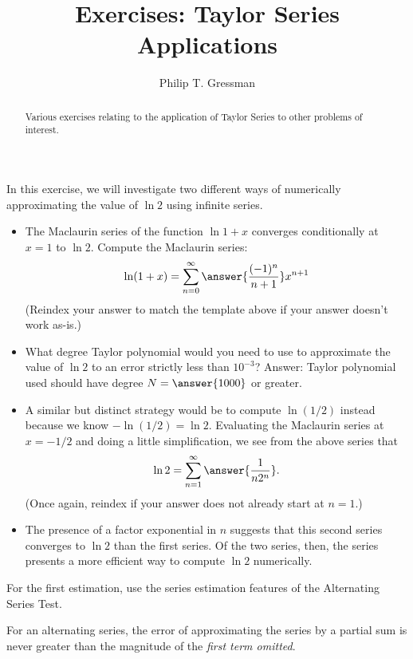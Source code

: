 \documentclass{ximera}
\title{Exercises: Taylor Series Applications}
\author{Philip T. Gressman}
\begin{document}
\begin{abstract}
Various exercises relating to the application of Taylor Series to other problems of interest.
\end{abstract}
\maketitle



\begin{exercise}
In this exercise, we will investigate two different ways of numerically approximating the value of $\ln 2$ using infinite series.

\begin{itemize}
\item The Maclaurin series of the function $\ln 1 + x$ converges conditionally at $x = 1$ to $\ln 2$. Compute the Maclaurin series: 
\[ \ln (1 + x) = \sum_{n=0}^\infty \answer{\frac{(-1)^n}{n+1}} x^{n+1} \]
(Reindex your answer to match the template above if your answer doesn't work as-is.)
\item  What degree Taylor polynomial would you need to use to approximate the value of $\ln 2$ to an error strictly less than $10^{-3}$? Answer: Taylor polynomial used should have degree $N = \answer{1000}$ or greater.
\item A similar but distinct strategy would be to compute $\ln (1/2)$ instead because we know $- \ln (1/2)  = \ln 2$. Evaluating the Maclaurin series at $x=-1/2$ and doing a little simplification, we see from the above series that
\[ \ln 2 = \sum_{n=1}^\infty \answer{\frac{1}{n 2^n}}. \]
(Once again, reindex if your answer does not already start at $n=1$.)
\item The presence of a factor exponential in $n$ suggests that this second series converges to $\ln 2$  than the first series. Of the two series, then, the  series presents a more efficient way to compute $\ln 2$ numerically.
\end{itemize}
\begin{hint}
For the first estimation, use the series estimation features of the Alternating Series Test.
\begin{hint}
For an alternating series, the error of approximating the series by a partial sum is never greater than the magnitude of the \textit{first term omitted}.
\end{hint}
\end{hint}
\end{exercise}
\end{document}
